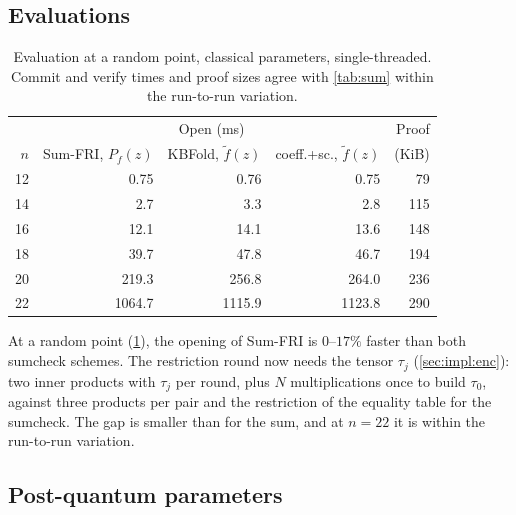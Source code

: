 \subsection{Evaluations}\label{sec:exp:eval}

\begin{table}[t]
\centering
\small
\begin{tabular}{r rrr r}
\toprule
 & \multicolumn{3}{c}{Open (ms)} & Proof \\
$n$ & Sum-FRI, $P_f(z)$ & KBFold, $\tilde f(z)$ & coeff.+sc., $\tilde f(z)$ & (KiB) \\
\midrule
12 & 0.75 & 0.76 & 0.75 & 79 \\
14 & 2.7 & 3.3 & 2.8 & 115 \\
16 & 12.1 & 14.1 & 13.6 & 148 \\
18 & 39.7 & 47.8 & 46.7 & 194 \\
20 & 219.3 & 256.8 & 264.0 & 236 \\
22 & 1064.7 & 1115.9 & 1123.8 & 290 \\
\bottomrule
\end{tabular}
\caption{Evaluation at a random point, classical parameters, single-threaded. Commit and verify times and proof sizes agree with \cref{tab:sum} within the run-to-run variation.}
\label{tab:eval}
\end{table}

At a random point (\cref{tab:eval}), the opening of Sum-FRI is $0$--$17\%$ faster than both sumcheck schemes.
The restriction round now needs the tensor $\tau_j$ (\cref{sec:impl:enc}): two inner products with $\tau_j$ per round, plus $N$ multiplications once to build $\tau_0$, against three products per pair and the restriction of the equality table for the sumcheck.
The gap is smaller than for the sum, and at $n = 22$ it is within the run-to-run variation.

\subsection{Post-quantum parameters}\label{sec:exp:pq}

